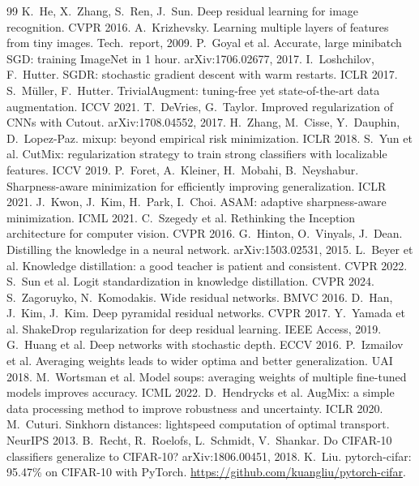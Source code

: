 \documentclass[10pt]{article}
\begin{document}
\small
\begin{thebibliography}{99}\setlength{\itemsep}{0pt}
 K.~He, X.~Zhang, S.~Ren, J.~Sun. Deep residual learning for image recognition. CVPR 2016.
 A.~Krizhevsky. Learning multiple layers of features from tiny images. Tech.\ report, 2009.
 P.~Goyal et al. Accurate, large minibatch SGD: training ImageNet in 1 hour. arXiv:1706.02677, 2017.
 I.~Loshchilov, F.~Hutter. SGDR: stochastic gradient descent with warm restarts. ICLR 2017.
 S.~M\"uller, F.~Hutter. TrivialAugment: tuning-free yet state-of-the-art data augmentation. ICCV 2021.
 T.~DeVries, G.~Taylor. Improved regularization of CNNs with Cutout. arXiv:1708.04552, 2017.
 H.~Zhang, M.~Cisse, Y.~Dauphin, D.~Lopez-Paz. mixup: beyond empirical risk minimization. ICLR 2018.
 S.~Yun et al. CutMix: regularization strategy to train strong classifiers with localizable features. ICCV 2019.
 P.~Foret, A.~Kleiner, H.~Mobahi, B.~Neyshabur. Sharpness-aware minimization for efficiently improving generalization. ICLR 2021.
 J.~Kwon, J.~Kim, H.~Park, I.~Choi. ASAM: adaptive sharpness-aware minimization. ICML 2021.
 C.~Szegedy et al. Rethinking the Inception architecture for computer vision. CVPR 2016.
 G.~Hinton, O.~Vinyals, J.~Dean. Distilling the knowledge in a neural network. arXiv:1503.02531, 2015.
 L.~Beyer et al. Knowledge distillation: a good teacher is patient and consistent. CVPR 2022.
 S.~Sun et al. Logit standardization in knowledge distillation. CVPR 2024.
 S.~Zagoruyko, N.~Komodakis. Wide residual networks. BMVC 2016.
 D.~Han, J.~Kim, J.~Kim. Deep pyramidal residual networks. CVPR 2017.
 Y.~Yamada et al. ShakeDrop regularization for deep residual learning. IEEE Access, 2019.
 G.~Huang et al. Deep networks with stochastic depth. ECCV 2016.
 P.~Izmailov et al. Averaging weights leads to wider optima and better generalization. UAI 2018.
 M.~Wortsman et al. Model soups: averaging weights of multiple fine-tuned models improves accuracy. ICML 2022.
 D.~Hendrycks et al. AugMix: a simple data processing method to improve robustness and uncertainty. ICLR 2020.
 M.~Cuturi. Sinkhorn distances: lightspeed computation of optimal transport. NeurIPS 2013.
 B.~Recht, R.~Roelofs, L.~Schmidt, V.~Shankar. Do CIFAR-10 classifiers generalize to CIFAR-10? arXiv:1806.00451, 2018.
 K.~Liu. pytorch-cifar: 95.47\% on CIFAR-10 with PyTorch. \url{https://github.com/kuangliu/pytorch-cifar}.
\end{thebibliography}
\end{document}
